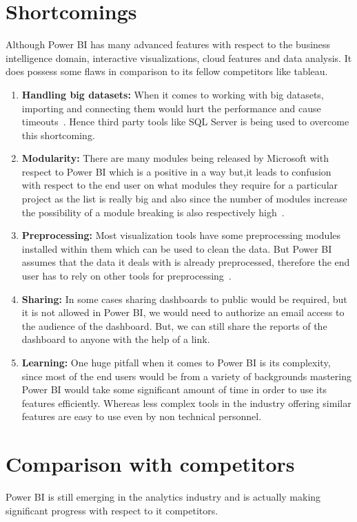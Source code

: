 \section{Shortcomings}
Although Power BI has many advanced features with respect to the business intelligence 
domain, interactive visualizations, cloud features and data analysis. It does possess 
some flaws in comparison to its fellow competitors like tableau. 
\begin{enumerate}
\item \textbf{Handling big datasets:} When it comes to working with big datasets,
importing and connecting them would hurt the performance and cause timeouts~\cite{hid-sp18-418-powerbi-review}.
Hence third party tools like SQL Server is being used to overcome this shortcoming.
\item \textbf{Modularity:} There are many modules being released by Microsoft with 
respect to Power BI which is a positive in a way but,it leads to confusion with respect 
to the end user on what modules they require for a particular project as the list is 
really big and also since the number of modules increase the possibility of a module 
breaking is also respectively high~\cite{hid-sp18-418-powerbi-review}.
\item \textbf{Preprocessing:} Most visualization tools have some preprocessing modules 
installed within them which can be used to clean the data. But Power BI assumes that the 
data it deals with is already preprocessed, therefore the end user has to rely on other 
tools for preprocessing~\cite{hid-sp18-418-powerbi-review}. 
\item \textbf{Sharing:} In some cases sharing dashboards to public would be required, 
but it is not allowed in Power BI, we would need to authorize an email access to the audience 
of the dashboard. But, we can still share the reports of the dashboard to anyone with 
the help of a link.
\item \textbf{Learning:} One huge pitfall when it comes to Power BI is its complexity, 
since most of the end users would be from a variety of backgrounds mastering Power BI 
would take some significant amount of time in order to use its features efficiently. 
Whereas less complex tools in the industry offering similar features are easy to use 
even by non technical personnel.
\end{enumerate}

\section{Comparison with competitors}
Power BI is still emerging in the analytics industry and is actually making significant 
progress with respect to it competitors.

